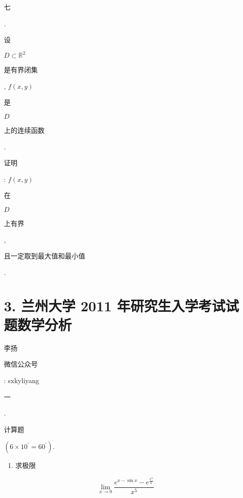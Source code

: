 \documentclass[10pt]{article}
\begin{document}
\begin{CJK}{UTF8}{mj}七\end{CJK}. \begin{CJK}{UTF8}{mj}设\end{CJK} $D \subset \mathbb{R}^{2}$ \begin{CJK}{UTF8}{mj}是有界闭集\end{CJK}, $f(x, y)$ \begin{CJK}{UTF8}{mj}是\end{CJK} $D$ \begin{CJK}{UTF8}{mj}上的连续函数\end{CJK}. \begin{CJK}{UTF8}{mj}证明\end{CJK}: $f(x, y)$ \begin{CJK}{UTF8}{mj}在\end{CJK} $D$ \begin{CJK}{UTF8}{mj}上有界\end{CJK}, \begin{CJK}{UTF8}{mj}且一定取到最大值和最小值\end{CJK}.

\section{3. 兰州大学 2011 年研究生入学考试试题数学分析}
\begin{CJK}{UTF8}{mj}李扬\end{CJK}

\begin{CJK}{UTF8}{mj}微信公众号\end{CJK}: sxkyliyang

\begin{CJK}{UTF8}{mj}一\end{CJK}. \begin{CJK}{UTF8}{mj}计算题\end{CJK} $\left(6 \times 10^{\prime}=60^{\prime}\right)$.

\begin{enumerate}
  \item \begin{CJK}{UTF8}{mj}求极限\end{CJK}
\end{enumerate}
$$
\lim _{x \rightarrow 0} \frac{e^{x-\sin x}-e^{\frac{x^{3}}{6}}}{x^{5}}
$$
\end{document}
